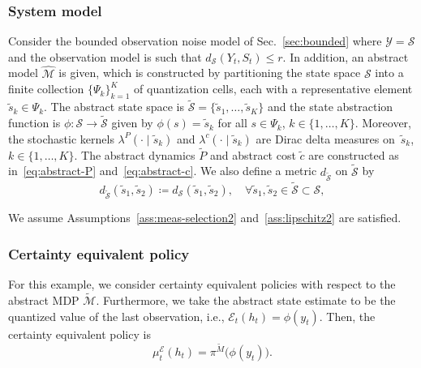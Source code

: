 \documentclass[letterpaper, 10pt]{IEEEtran}
\theoremstyle{plain}
\theoremstyle{nonumberplain}
\theoremstyle{plain}
\newcommand*\ALPHABET{\mathcal}
\newcommand*\ABSTRACT{\tilde}
\newcommand\EST{\mathcal{E}}
\begin{document}
\subsubsection{System model}
Consider the bounded observation noise model of Sec.~\ref{sec:bounded} where $\ALPHABET Y = \ALPHABET S$ and the observation model is such that $d_{\ALPHABET S}(Y_t, S_t) \le r$. In addition, an abstract model $\hat {\ALPHABET M}$ is given, which is constructed by partitioning the state space $\ALPHABET S$ into a finite collection $\{\Psi_k\}_{k=1}^{K}$ of quantization cells, each with a representative element $\ABSTRACT s_k \in \Psi_k$. The abstract state space is $\ABSTRACT {\ALPHABET S} = \{\ABSTRACT s_1, \dots, \ABSTRACT s_K\}$ and the state abstraction function is 
$\phi: \ALPHABET S \to \ABSTRACT{\ALPHABET S}$ given by $\phi(s) = \ABSTRACT s_k$ for all $s \in \Psi_k$, $k \in \{1, \dots, K\}$. 
Moreover, the stochastic kernels $\lambda^P(\cdot \mid \ABSTRACT s_k)$ and $\lambda^c(\cdot \mid \ABSTRACT s_k)$ are Dirac delta measures on~$\ABSTRACT {s}_k$, $k \in \{1,\dots, K\}$. The abstract dynamics $\tilde P$ and abstract cost $\tilde c$ are constructed as in~\eqref{eq:abstract-P} and~\eqref{eq:abstract-c}. We also define a metric $d_{\ABSTRACT{\ALPHABET S}}$ on $\ABSTRACT{\ALPHABET S}$ by
\[
    d_{\ABSTRACT{\ALPHABET S}}(\ABSTRACT s_1, \ABSTRACT s_2) \coloneqq d_{\ALPHABET S}(\ABSTRACT s_1, \ABSTRACT s_2), \quad \forall \ABSTRACT s_1, \ABSTRACT s_2 \in \ABSTRACT{\ALPHABET S} \subset \ALPHABET S,
\] 



We assume Assumptions~\ref{ass:meas-selection2} and~\ref{ass:lipschitz2} are satisfied.

\subsubsection{Certainty equivalent policy}
For this example, we consider certainty equivalent policies with respect to the abstract MDP $\ABSTRACT{\ALPHABET M}$.  Furthermore, 
we take the abstract state estimate to be the quantized value of the last observation, i.e., $\EST_t(h_t) = \phi(y_t)$. Then, the certainty equivalent policy is 
\[
    \mu_t^{\EST}(h_t) = \pi^{\ABSTRACT M}\bigl(\phi(y_t)\bigr).
\]
\end{document}
